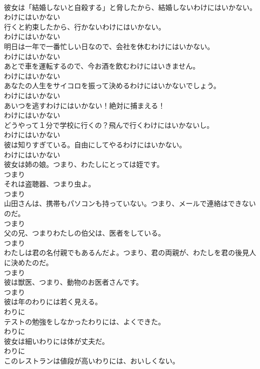 \documentclass[8pt]{extreport}
\begin{document}
\begin{CJK}{UTF8}{min}
\\	彼女は「結婚しないと自殺する」と脅したから、結婚しないわけにはいかない。	
\\	わけにはいかない
\\	行くと約束したから、行かないわけにはいかない。	
\\	わけにはいかない
\\	明日は一年で一番忙しい日なので、会社を休むわけにはいかない。	
\\	わけにはいかない
\\	あとで車を運転するので、今お酒を飲むわけにはいきません。	
\\	わけにはいかない
\\	あなたの人生をサイコロを振って決めるわけにはいかないでしょう。	
\\	わけにはいかない
\\	あいつを逃すわけにはいかない！絶対に捕まえる！	
\\	わけにはいかない
\\	どうやって１分で学校に行くの？飛んで行くわけにはいかないし。	
\\	わけにはいかない
\\	彼は知りすぎている。自由にしてやるわけにはいかない。	
\\	わけにはいかない
\\	彼女は姉の娘。つまり、わたしにとっては姪です。	
\\	つまり
\\	それは盗聴器、つまり虫よ。	
\\	つまり
\\	山田さんは、携帯もパソコンも持っていない。つまり、メールで連絡はできないのだ。	
\\	つまり
\\	父の兄、つまりわたしの伯父は、医者をしている。	
\\	つまり
\\	わたしは君の名付親でもあるんだよ。つまり、君の両親が、わたしを君の後見人に決めたのだ。	
\\	つまり
\\	彼は獣医、つまり、動物のお医者さんです。	
\\	つまり
\\	彼は年のわりには若く見える。	
\\	わりに
\\	テストの勉強をしなかったわりには、よくできた。	
\\	わりに
\\	彼女は細いわりには体が丈夫だ。	
\\	わりに
\\	このレストランは値段が高いわりには、おいしくない。	

\end{CJK}
\end{document}
